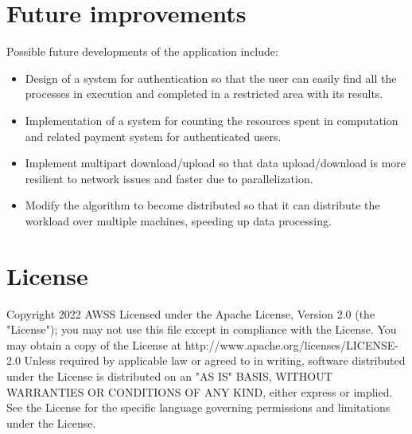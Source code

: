 \documentclass[a4paper,10pt, titlepage]{article}
\begin{document}
\section{Future improvements}
Possible future developments of the application include:
\begin{itemize}
	\item Design of a system for authentication so that the user can easily find all the processes in execution and completed in a restricted area with its results.
	\item Implementation of a system for counting the resources spent in computation and related payment system for authenticated users.
	\item Implement multipart download/upload so that data upload/download is more resilient to network issues and faster due to parallelization.
	\item Modify the algorithm to become distributed so that it can distribute the workload over multiple machines, speeding up data processing.
\end{itemize}
\section{License}
Copyright 2022 AWSS\newline
\newline
Licensed under the Apache License, Version 2.0 (the "License"); you may not use this file except in compliance with the License. You may obtain a copy of the License at\newline
\newline
	http://www.apache.org/licenses/LICENSE-2.0\newline
\newline
Unless required by applicable law or agreed to in writing, software distributed under the License is distributed on an "AS IS" BASIS, WITHOUT WARRANTIES OR CONDITIONS OF ANY KIND, either express or implied.
See the License for the specific language governing permissions and limitations under the License.\newline
\end{document}
